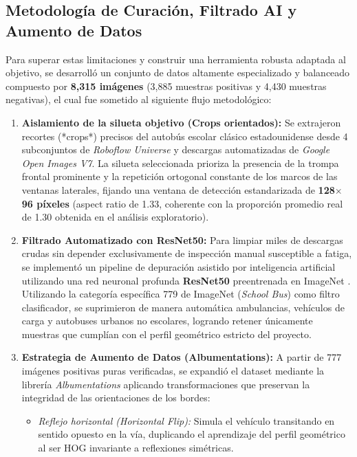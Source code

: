 \documentclass[12pt]{article}
\begin{document}
\subsection{Metodología de Curación, Filtrado AI y Aumento de Datos}
Para superar estas limitaciones y construir una herramienta robusta adaptada al objetivo, se desarrolló un conjunto de datos altamente especializado y balanceado compuesto por \textbf{8,315 imágenes} (3,885 muestras positivas y 4,430 muestras negativas), el cual fue sometido al siguiente flujo metodológico:

\begin{enumerate}
    \item \textbf{Aislamiento de la silueta objetivo (Crops orientados):} Se extrajeron recortes (*crops*) precisos del autobús escolar clásico estadounidense desde 4 subconjuntos de \emph{Roboflow Universe} y descargas automatizadas de \emph{Google Open Images V7}. La silueta seleccionada prioriza la presencia de la trompa frontal prominente y la repetición ortogonal constante de los marcos de las ventanas laterales, fijando una ventana de detección estandarizada de \textbf{128$\times$96 píxeles} (aspect ratio de 1.33, coherente con la proporción promedio real de 1.30 obtenida en el análisis exploratorio).
    \item \textbf{Filtrado Automatizado con ResNet50:} Para limpiar miles de descargas crudas sin depender exclusivamente de inspección manual susceptible a fatiga, se implementó un pipeline de depuración asistido por inteligencia artificial utilizando una red neuronal profunda \textbf{ResNet50} preentrenada en ImageNet \cite{he2016resnet}. Utilizando la categoría específica 779 de ImageNet (\emph{School Bus}) como filtro clasificador, se suprimieron de manera automática ambulancias, vehículos de carga y autobuses urbanos no escolares, logrando retener únicamente muestras que cumplían con el perfil geométrico estricto del proyecto.
    \item \textbf{Estrategia de Aumento de Datos (Albumentations):} A partir de 777 imágenes positivas puras verificadas, se expandió el dataset mediante la librería \emph{Albumentations} aplicando transformaciones que preservan la integridad de las orientaciones de los bordes:
    \begin{itemize}
        \item \emph{Reflejo horizontal (Horizontal Flip):} Simula el vehículo transitando en sentido opuesto en la vía, duplicando el aprendizaje del perfil geométrico al ser HOG invariante a reflexiones simétricas.

\end{itemize}
\end{enumerate}
\end{document}
